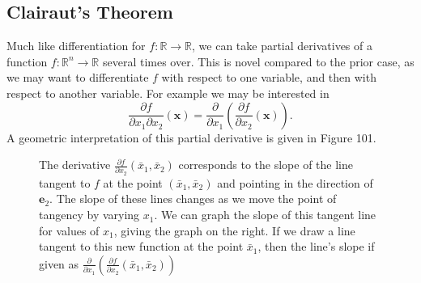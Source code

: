 \documentclass{article}
\newcommand{\R}{\mathbb{R}}
\newcommand{\x}{\mathbf{x}}
\theoremstyle{definition}
\begin{document}
	\subsection{Clairaut's Theorem}
	Much like differentiation for $ f:\R\to\R $, we can take partial derivatives of a function $ f:\R^n\to\R $ several times over. This is novel compared to the prior case, as we may want to differentiate $ f $ with respect to one variable, and then with respect to another variable. For example we may be interested in $$\frac{\partial f}{\partial x_1\partial x_2}(\x) = \frac{\partial }{\partial x_1}\left(\frac{\partial f}{\partial x_2}(\x)\right).$$ A geometric interpretation of this partial derivative is given in Figure 101. 
	\begin{figure}
		\centering
		\caption{The derivative $ \frac{\partial f}{\partial x_2}(\bar x_1, \bar x_2)  $ corresponds to the slope of the line tangent to $ f $ at the point $ (\bar x_1,\bar x_2) $ and pointing in the direction of $ \mathbf e_2 $. The slope of these lines changes as we move the point of tangency by varying $ x_1 $. We can graph the slope of this tangent line for values of $ x_1 $, giving the graph on the right. If we draw a line tangent to this new function at the point $ \bar x_1 $, then the line's slope if given as $ \frac{\partial }{\partial x_1}\left(\frac{\partial f}{\partial x_2}(\bar x_1,\bar x_2)\right) $}
	\end{figure}	
	
\end{document}
